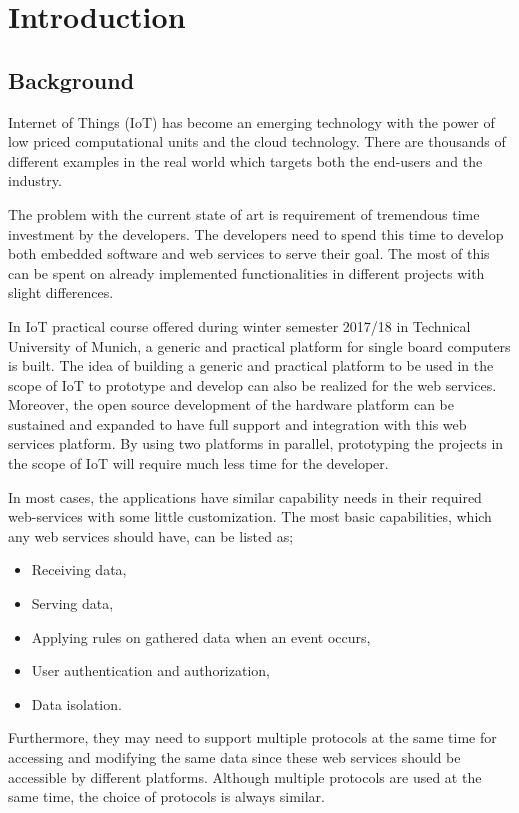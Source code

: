 
\chapter{Introduction}\label{chapter:introduction}

\section{Background}
Internet of Things (IoT) has become an emerging technology with the power of low priced computational units and the cloud technology. There are thousands of different examples in the real world which targets both the end-users and the industry. 

The problem with the current state of art is requirement of tremendous time investment by the developers. The developers need to spend this time to develop both embedded software and web services to serve their goal. The most of this can be spent on already implemented functionalities in different projects with slight differences.

In IoT practical course offered during winter semester 2017/18 in Technical University of Munich, a generic and practical platform for single board computers is built. The idea of building a generic and practical platform to be used in the scope of IoT to prototype and develop can also be realized for the web services. Moreover, the open source development of the hardware platform can be sustained and expanded to have full support and integration with this web services platform. By using two platforms in parallel, prototyping the projects in the scope of IoT will require much less time for the developer.

In most cases, the applications have similar capability needs in their required web-services with some little customization. The most basic capabilities, which any web services should have, can be listed as;
\begin{itemize}
  \item Receiving data,
  \item Serving data,
  \item Applying rules on gathered data when an event occurs,
  \item User authentication and authorization,
  \item Data isolation.
\end{itemize}
 Furthermore, they may need to support multiple protocols at the same time for accessing and modifying the same data since these web services should be accessible by different platforms. Although multiple protocols are used at the same time, the choice of protocols is always similar. 

